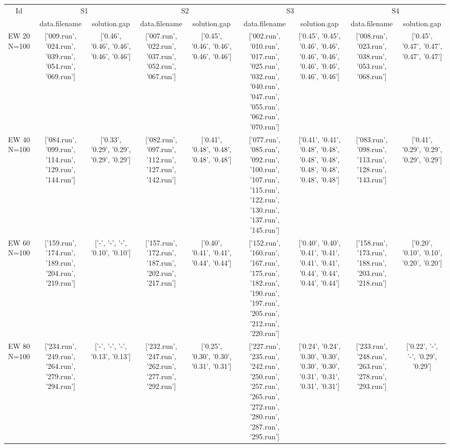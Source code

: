 \documentclass[landscape, 12pt]{report}
\begin{document}
\begin{tabular}{|c|cc|cc|cc|cc|}
\hline
\multicolumn{1}{|c|}{Id} & \multicolumn{2}{|c|}{S1} & \multicolumn{2}{|c|}{S2} & \multicolumn{2}{|c|}{S3} & \multicolumn{2}{|c|}{S4}
\\
 & data.filename & solution.gap & data.filename & solution.gap & data.filename & solution.gap & data.filename & solution.gap
\\
\hline
EW 20 N=100 & ['009.run', '024.run', '039.run', '054.run', '069.run'] & ['0.46', '0.46', '0.46', '0.46', '0.46'] & ['007.run', '022.run', '037.run', '052.run', '067.run'] & ['0.45', '0.46', '0.46', '0.46', '0.46'] & ['002.run', '010.run', '017.run', '025.run', '032.run', '040.run', '047.run', '055.run', '062.run', '070.run'] & ['0.45', '0.45', '0.46', '0.46', '0.46', '0.46', '0.46', '0.46', '0.46', '0.46'] & ['008.run', '023.run', '038.run', '053.run', '068.run'] & ['0.45', '0.47', '0.47', '0.47', '0.47']
\\
EW 40 N=100 & ['084.run', '099.run', '114.run', '129.run', '144.run'] & ['0.33', '0.29', '0.29', '0.29', '0.29'] & ['082.run', '097.run', '112.run', '127.run', '142.run'] & ['0.41', '0.48', '0.48', '0.48', '0.48'] & ['077.run', '085.run', '092.run', '100.run', '107.run', '115.run', '122.run', '130.run', '137.run', '145.run'] & ['0.41', '0.41', '0.48', '0.48', '0.48', '0.48', '0.48', '0.48', '0.48', '0.48'] & ['083.run', '098.run', '113.run', '128.run', '143.run'] & ['0.41', '0.29', '0.29', '0.29', '0.29']
\\
EW 60 N=100 & ['159.run', '174.run', '189.run', '204.run', '219.run'] & ['-', '-', '-', '0.10', '0.10'] & ['157.run', '172.run', '187.run', '202.run', '217.run'] & ['0.40', '0.41', '0.41', '0.44', '0.44'] & ['152.run', '160.run', '167.run', '175.run', '182.run', '190.run', '197.run', '205.run', '212.run', '220.run'] & ['0.40', '0.40', '0.41', '0.41', '0.41', '0.41', '0.44', '0.44', '0.44', '0.44'] & ['158.run', '173.run', '188.run', '203.run', '218.run'] & ['0.20', '0.10', '0.10', '0.20', '0.20']
\\
EW 80 N=100 & ['234.run', '249.run', '264.run', '279.run', '294.run'] & ['-', '-', '-', '0.13', '0.13'] & ['232.run', '247.run', '262.run', '277.run', '292.run'] & ['0.25', '0.30', '0.30', '0.31', '0.31'] & ['227.run', '235.run', '242.run', '250.run', '257.run', '265.run', '272.run', '280.run', '287.run', '295.run'] & ['0.24', '0.24', '0.30', '0.30', '0.30', '0.30', '0.31', '0.31', '0.31', '0.31'] & ['233.run', '248.run', '263.run', '278.run', '293.run'] & ['0.22', '-', '-', '0.29', '0.29']
\\

\end{tabular}
\end{document}
